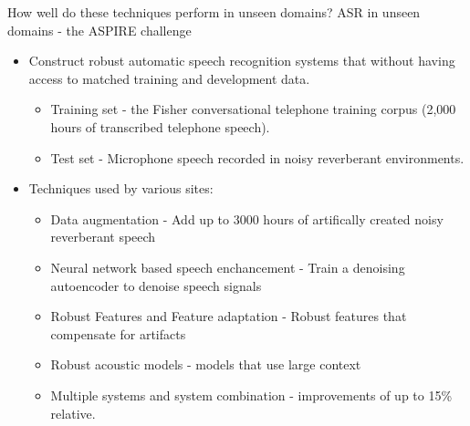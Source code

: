 \begin{frame} {How well do these techniques perform in unseen domains?}
{ASR in unseen domains - the ASPIRE challenge}

\begin{itemize}
\item Construct robust automatic speech recognition systems that \alert{without having access to matched training and
development data}.
\begin{itemize}
\item \alert{Training set}  - the Fisher conversational telephone training corpus (2,000 hours of transcribed telephone speech).
\item \alert{Test set} - Microphone speech recorded in noisy reverberant environments.
\end{itemize}
\item Techniques used by various sites:
\begin{itemize}
\item Data augmentation - Add up to 3000 hours of artifically created noisy reverberant speech
\item Neural network based speech enchancement - Train a denoising autoencoder to denoise speech signals
\item Robust Features and Feature adaptation - Robust features that compensate for artifacts
\item Robust acoustic models - models that use large context
\item Multiple systems and system combination - improvements of up to 15\% relative.
\end{itemize}
\end{itemize}
\end{frame}

